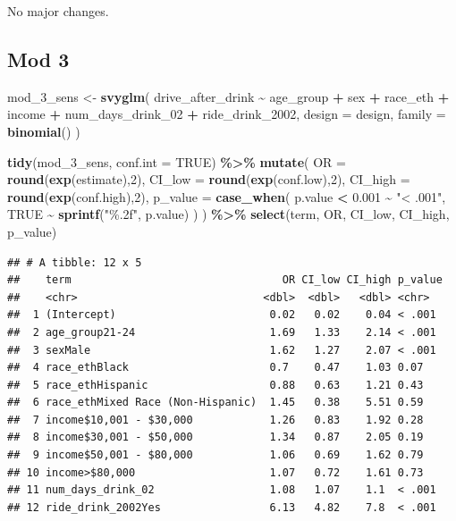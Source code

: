 \documentclass[
]{article}
\newenvironment{Shaded}{\begin{snugshade}}{\end{snugshade}}
\newcommand{\AttributeTok}[1]{\textcolor[rgb]{0.13,0.29,0.53}{#1}}
\newcommand{\ConstantTok}[1]{\textcolor[rgb]{0.56,0.35,0.01}{#1}}
\newcommand{\DecValTok}[1]{\textcolor[rgb]{0.00,0.00,0.81}{#1}}
\newcommand{\FloatTok}[1]{\textcolor[rgb]{0.00,0.00,0.81}{#1}}
\newcommand{\FunctionTok}[1]{\textcolor[rgb]{0.13,0.29,0.53}{\textbf{#1}}}
\newcommand{\NormalTok}[1]{#1}
\newcommand{\OtherTok}[1]{\textcolor[rgb]{0.56,0.35,0.01}{#1}}
\newcommand{\SpecialCharTok}[1]{\textcolor[rgb]{0.81,0.36,0.00}{\textbf{#1}}}
\newcommand{\StringTok}[1]{\textcolor[rgb]{0.31,0.60,0.02}{#1}}
\begin{document}
No major changes.

\subsection{Mod 3}\label{mod-3}

\begin{Shaded}
\begin{Highlighting}[]
\NormalTok{mod\_3\_sens }\OtherTok{\textless{}{-}} \FunctionTok{svyglm}\NormalTok{(}
\NormalTok{  drive\_after\_drink }\SpecialCharTok{\textasciitilde{}}\NormalTok{ age\_group }\SpecialCharTok{+}\NormalTok{ sex }\SpecialCharTok{+}\NormalTok{ race\_eth }\SpecialCharTok{+}\NormalTok{ income }\SpecialCharTok{+} 
\NormalTok{     num\_days\_drink\_02 }\SpecialCharTok{+}\NormalTok{ ride\_drink\_2002,}
  \AttributeTok{design =}\NormalTok{ design,}
  \AttributeTok{family =} \FunctionTok{binomial}\NormalTok{()}
\NormalTok{) }

\FunctionTok{tidy}\NormalTok{(mod\_3\_sens, }\AttributeTok{conf.int =} \ConstantTok{TRUE}\NormalTok{) }\SpecialCharTok{\%\textgreater{}\%}
  \FunctionTok{mutate}\NormalTok{(}
    \AttributeTok{OR =} \FunctionTok{round}\NormalTok{(}\FunctionTok{exp}\NormalTok{(estimate),}\DecValTok{2}\NormalTok{),}
    \AttributeTok{CI\_low =} \FunctionTok{round}\NormalTok{(}\FunctionTok{exp}\NormalTok{(conf.low),}\DecValTok{2}\NormalTok{),}
    \AttributeTok{CI\_high =} \FunctionTok{round}\NormalTok{(}\FunctionTok{exp}\NormalTok{(conf.high),}\DecValTok{2}\NormalTok{),}
    \AttributeTok{p\_value =} \FunctionTok{case\_when}\NormalTok{(}
\NormalTok{      p.value }\SpecialCharTok{\textless{}} \FloatTok{0.001} \SpecialCharTok{\textasciitilde{}} \StringTok{"\textless{} .001"}\NormalTok{,}
      \ConstantTok{TRUE} \SpecialCharTok{\textasciitilde{}} \FunctionTok{sprintf}\NormalTok{(}\StringTok{"\%.2f"}\NormalTok{, p.value)}
\NormalTok{    )}
\NormalTok{  ) }\SpecialCharTok{\%\textgreater{}\%}
  \FunctionTok{select}\NormalTok{(term, OR, CI\_low, CI\_high, p\_value)}
\end{Highlighting}
\end{Shaded}

\begin{verbatim}
## # A tibble: 12 x 5
##    term                                 OR CI_low CI_high p_value
##    <chr>                             <dbl>  <dbl>   <dbl> <chr>  
##  1 (Intercept)                        0.02   0.02    0.04 < .001 
##  2 age_group21-24                     1.69   1.33    2.14 < .001 
##  3 sexMale                            1.62   1.27    2.07 < .001 
##  4 race_ethBlack                      0.7    0.47    1.03 0.07   
##  5 race_ethHispanic                   0.88   0.63    1.21 0.43   
##  6 race_ethMixed Race (Non-Hispanic)  1.45   0.38    5.51 0.59   
##  7 income$10,001 - $30,000            1.26   0.83    1.92 0.28   
##  8 income$30,001 - $50,000            1.34   0.87    2.05 0.19   
##  9 income$50,001 - $80,000            1.06   0.69    1.62 0.79   
## 10 income>$80,000                     1.07   0.72    1.61 0.73   
## 11 num_days_drink_02                  1.08   1.07    1.1  < .001 
## 12 ride_drink_2002Yes                 6.13   4.82    7.8  < .001
\end{verbatim}
\end{document}
